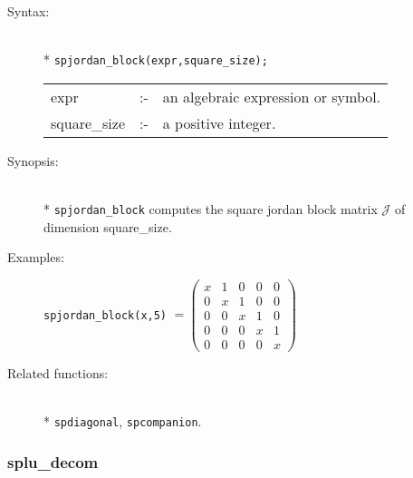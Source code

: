 \begin{description}
\item[Syntax:]\mbox{}\\*
 \texttt{spjordan\_block(expr,square\_size);}\\[2mm]
\begin{tabular}{l l l}
expr        &:-& an algebraic expression or symbol. \\
square\_size &:-& a positive integer.
\end{tabular}

\item[Synopsis:]\mbox{}\\*
\texttt{spjordan\_block} computes the square jordan block matrix $\mathcal{J}$
                of dimension square\_size.

\item[Examples:]
\texttt{spjordan\_block(x,5)} \( =
\begin{pmatrix} x & 1 & 0 & 0 & 0 \\ 0 & x & 1 & 0 & 0 \\ 0
& 0 & x & 1 & 0 \\ 0 & 0 & 0 & x & 1 \\ 0 & 0 & 0 & 0 & x
\end{pmatrix}\)

\item[Related functions:]\mbox{}\\*
 \texttt{spdiagonal}, \texttt{spcompanion}.
\end{description}

\subsubsection{splu\_decom}
\label{sparse:splu_decom}
\hypertarget{operator:SPLU_DECOM}{}

